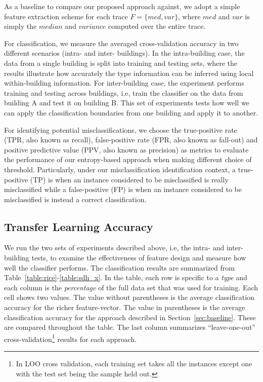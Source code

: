 As a baseline to compare our proposed approach against, we adopt a simple feature extraction scheme for each trace $F=\{med, var\}$, where $med$ and $var$ is simply 
the $median$ and $variance$ computed over the entire trace.

For classification, we measure the averaged cross-validation accuracy in two different scenarios (intra- and inter- buildings). In the intra-building case, the 
data from a single building is split into training and testing sets, where the results illustrate how accurately the type information can be inferred using local 
within-building information. For inter-building case, the experiment performs training and testing across buildings, i.e, train the classifier on the data from building A 
and test it on building B.  
This set of experiments tests how well we can apply the classification boundaries from one building and apply it to another.

For identifying potential misclassifications, we choose the true-positive rate (TPR, also known as recall), false-positive rate (FPR, also known as fall-out) and positive predictive 
value (PPV, also known as precision) as metrics to evaluate the performance of our entropy-based approach when making different choice of threshold. Particularly, under our misclassification
identification context, a true-positive (TP) is when an instance considered to be misclassified is really misclassified while a false-positive (FP) is when an instance considered to be misclassified 
is instead a correct classification.

\subsection{Transfer Learning Accuracy}
We run the two sets of experiments described above, i.e, the intra- and inter- building tests, to examine the effectiveness of feature design and measure how well 
the classifier performs. The classification results are summarized from Table~\ref{table:rice}-\ref{table:sdh_x}. %
In the table, each row is specific to a \emph{type} and each column is the \emph{percentage} of the full data set that was used for training.
Each cell shows two values.  The value without parentheses is the average classification accuracy for the richer feature-vector. 
The value in parentheses is the average classification accuracy for the approach described in 
Section~\ref{sec:baseline}. These are compared throughout the table.
The last column summarizes ``leave-one-out'' cross-validation\footnote{In LOO cross validation, each training set takes all the instances except one with the test set being 
the sample held out.} results for each approach.


